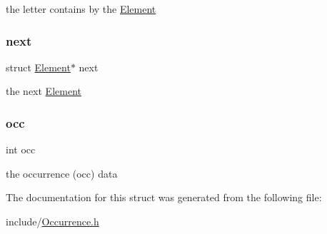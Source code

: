 the letter contains by the \hyperlink{struct_element}{Element} \mbox{\label{struct_element_a865f404995b432c38f0626e557399d27}} 
\subsubsection{\texorpdfstring{next}{next}}
{\footnotesize\ttfamily struct \hyperlink{struct_element}{Element}$\ast$ next}

the next \hyperlink{struct_element}{Element} \mbox{\label{struct_element_af31c4cdd2ddb799512125a78038c283f}} 
\subsubsection{\texorpdfstring{occ}{occ}}
{\footnotesize\ttfamily int occ}

the occurrence (occ) data 

The documentation for this struct was generated from the following file\+:\begin{DoxyCompactItemize}
\item 
include/\hyperlink{_occurrence_8h}{Occurrence.\+h}\end{DoxyCompactItemize}

